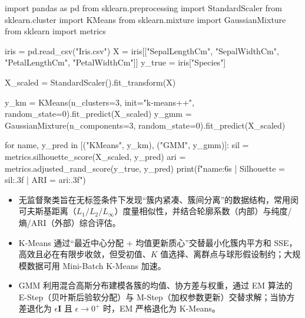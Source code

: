 \begin{codeblock}[language=Python,caption={标准化后对比 K-Means 与 GMM 的聚类内部/外部评价},label=lst:kmeans-gmm]
import pandas as pd
from sklearn.preprocessing import StandardScaler
from sklearn.cluster import KMeans
from sklearn.mixture import GaussianMixture
from sklearn import metrics

iris = pd.read_csv("Iris.csv")
X = iris[["SepalLengthCm", "SepalWidthCm", "PetalLengthCm", "PetalWidthCm"]]
y_true = iris["Species"]

X_scaled = StandardScaler().fit_transform(X)

y_km = KMeans(n_clusters=3, init="k-means++", random_state=0).fit_predict(X_scaled)
y_gmm = GaussianMixture(n_components=3, random_state=0).fit_predict(X_scaled)

for name, y_pred in [("KMeans", y_km), ("GMM", y_gmm)]:
    sil = metrics.silhouette_score(X_scaled, y_pred)
    ari = metrics.adjusted_rand_score(y_true, y_pred)
    print(f"{name:6s} | Silhouette = {sil:.3f} | ARI = {ari:.3f}")
\end{codeblock}

\begin{summary}[本章要点]
\begin{itemize}
  \item 无监督聚类旨在无标签条件下发现“簇内紧凑、簇间分离”的数据结构，常用闵可夫斯基距离（$L_1/L_2/L_\infty$）度量相似性，并结合轮廓系数（内部）与纯度/熵/ARI（外部）综合评估。
  \item K-Means 通过“最近中心分配 + 均值更新质心”交替最小化簇内平方和 SSE，高效且必在有限步收敛，但受初值、$K$ 值选择、离群点与球形假设制约；大规模数据可用 Mini-Batch K-Means 加速。
  \item GMM 利用混合高斯分布建模各簇的均值、协方差与权重，通过 EM 算法的 E-Step（贝叶斯后验软分配）与 M-Step（加权参数更新）交替求解；当协方差退化为 $\epsilon\bm{I}$ 且 $\epsilon\to 0^+$ 时，EM 严格退化为 K-Means。
\end{itemize}
\end{summary}
